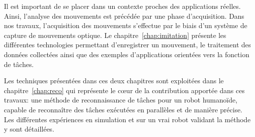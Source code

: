 Il est important de se placer dans un contexte proches des applications
réelles. Ainsi, l'analyse des mouvements est précédée par une phase d'acquisition.
Dans nos travaux, l'acquisition des mouvements s'effectue 
par le biais d'un système de capture de mouvements optique.
Le chapitre~\ref{chap:imitation} présente les différentes 
technologies permettant d'enregistrer un mouvement, le traitement
des données collectées ainsi que des exemples d'applications
orientées vers la fonction de t\^aches.

Les techniques présentées dans ces deux chapitres sont exploitées
dans le chapitre~\ref{chap:reco} qui représente
le c\oe ur de la contribution apportée dans ces travaux:
une méthode de reconnaissance de t\^aches pour un robot humanoïde,
capable de reconnaître des t\^aches exécutées en parallèles et de manière précise.
Les différentes expériences en simulation et sur
un vrai robot validant la méthode y sont détaillées.
